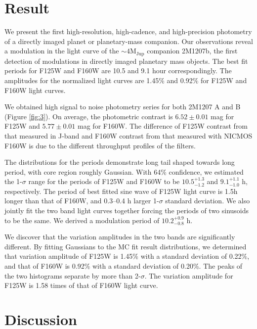 \documentclass[apj]{emulateapj}
\begin{document}
\section{Result}



\label{Results}
We present the first  high-resolution, high-cadence, and
high-precision photometry of a directly imaged planet or
planetary-mass companion. Our observations reveal a modulation in the
light curve of the $\sim 4 \mathrm{M_{{Jup}}}$ companion 2M1207b, the first detection
of modulations in directly imaged planetary mass objects.  The best fit
periods for F125W and F160W are 10.5 and 9.1 hour correspondingly. The
amplitudes for the normalized light curves are 1.45\% and 0.92\% for
F125W and F160W light curves. 

We obtained high signal to noise photometry series for both 2M1207 A
and B (Figure \ref{fig:3}). On average, the photometric contrast is
$6.52\pm0.01$ mag for
F125W and $5.77\pm0.01$ mag for F160W. The difference of F125W contrast
from that measured in J-band \citep{Mohanty2007} and
F160W contrast from that measured with NICMOS F160W 
\citep{Song2006} is due to the different throughput profiles of the
filters.


The distributions for the periods demonstrate long tail shaped towards
long period, with core region roughly Gaussian. With 64\% confidence,
we estimated the 1-$\sigma$ range for the periods of F125W and F160W
to be $10.5_{-1.2}^{+1.3}$ and $9.1_{-1.0}^{+1.1}$ h,
respectively. The period of best fitted sine wave of F125W light
curve is 1.5h longer than that of F160W, and 0.3--0.4 h larger
1-$\sigma$ standard deviation. We also jointly fit the two band light
curves together forcing the periods of two sinusoids to be the
same. We derived a modulation period of $10.2^{+0.9}_{-0.8}$ h.

We discover that the variation amplitudes in the two bands are significantly
different. By fitting Gaussians to the MC fit result distributions, we
determined that variation amplitude of F125W is 1.45\% with a
standard deviation of 0.22\%, and that of F160W is 0.92\% with a
standard deviation of 0.20\%. The peaks of the two
histograms separate by more than 2-$\sigma$. The variation amplitude
for F125W is 1.58 times of that of F160W light curve.


\section{Discussion}
\end{document}
